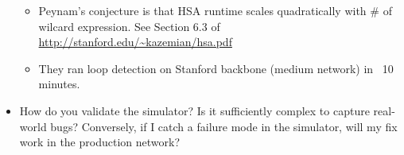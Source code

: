 \begin{itemize}
    \begin{itemize}
    \item Peynam's conjecture is that HSA runtime scales quadratically with \#
    of wilcard expression.  See Section 6.3 of
    \url{http://stanford.edu/~kazemian/hsa.pdf}
    \item They ran loop detection on Stanford backbone (medium network) in ~10
    minutes.
    \end{itemize}
\item How do you validate the simulator? Is it sufficiently complex to
capture real-world bugs? Conversely, if I catch a failure mode in the
simulator, will my fix work in the production network?
\end{itemize}
